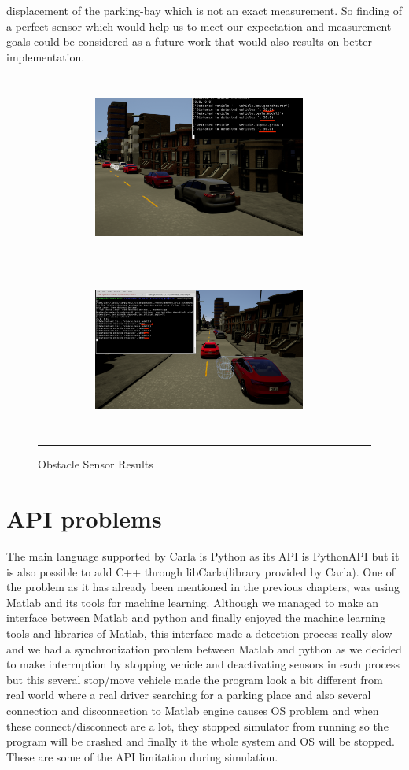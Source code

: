 displacement of the parking-bay which is not an exact measurement. So finding of a perfect sensor which would help us to meet our expectation and measurement goals could be considered as a future work that would also results on better implementation.
\begin{figure}
    \begin{tabular}{c|c}
         \includegraphics[width=7cm, height=6cm]{images/obst2.png} 
         \includegraphics[width=7cm, height=6cm]{images/obst1.png}
    \end{tabular}
    \caption{Obstacle Sensor Results}
    \label{fig:obst}
\end{figure}
\section{API problems}
The main language supported by Carla is Python as its API is PythonAPI but it is also possible to add C++ through libCarla(library provided by Carla). One of the problem as it has already been mentioned in the previous chapters, was using Matlab and its tools for machine learning. Although we managed to make an interface between Matlab and python and finally enjoyed the machine learning tools and libraries of Matlab, this interface made a detection process really slow and we had a synchronization problem between Matlab and python as we decided to make interruption by stopping vehicle and deactivating sensors in each process but this several stop/move vehicle made the program look a bit different from real world where a real driver searching for a parking place and also several connection and disconnection to Matlab engine causes OS problem and when these connect/disconnect are a lot, they stopped simulator from running so the program will be crashed and finally it the whole system and OS will be stopped. These are some of the API limitation during simulation.


